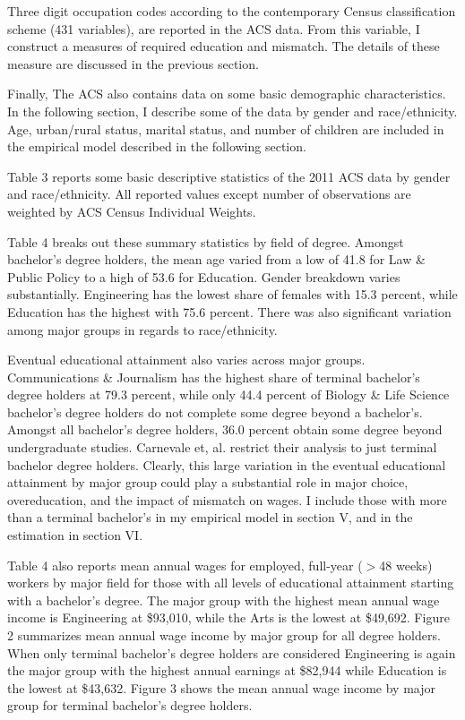 \documentclass[11pt]{article}
\theoremstyle{definition}
\begin{document}
\vspace{2mm}
Three digit occupation codes according to the contemporary Census classification scheme (431 variables), are reported in the ACS data.  From this variable, I construct a measures of required education and mismatch.  The details of these measure are discussed in the previous section.

\vspace{2mm}
Finally, The ACS also contains data on some basic demographic characteristics.  In the following section, I describe some of the data by gender and race/ethnicity.  Age, urban/rural status, marital status, and number of children are included in the empirical model described in the following section.

\vspace{2mm}
Table 3 reports some basic descriptive statistics of the 2011 ACS data by gender and race/ethnicity.  All reported values except number of observations are weighted by ACS Census Individual Weights.  

\vspace{2mm}
Table 4 breaks out these summary statistics by field of degree. Amongst bachelor's degree holders, the mean age varied from a low of 41.8 for Law \& Public Policy to a high of 53.6 for Education.  Gender breakdown varies substantially.  Engineering has the lowest share of females with 15.3 percent, while Education has the highest with 75.6 percent.  There was also significant variation among major groups in regards to race/ethnicity.  

\vspace{2mm}
Eventual educational attainment also varies across major groups.  Communications \& Journalism has the highest share of terminal bachelor's degree holders at 79.3 percent, while only 44.4 percent of Biology \& Life Science bachelor's degree holders do not complete some degree beyond a bachelor's.  Amongst all bachelor's degree holders, 36.0 percent obtain some degree beyond undergraduate studies.  Carnevale et, al. restrict their analysis to just terminal bachelor degree holders.  Clearly, this large variation in the eventual educational attainment by major group could play a substantial role in major choice, overeducation, and the impact of mismatch on wages.  I include those with more than a terminal bachelor's in my empirical model in section V, and in the estimation in section VI.  

\vspace{2mm}
Table 4 also reports mean annual wages for employed, full-year ($>$48 weeks) workers by major field for those with all levels of educational attainment starting with a bachelor's degree.  The major group with the highest mean annual wage income is Engineering at \$93,010, while the Arts is the lowest at \$49,692.  Figure 2 summarizes mean annual wage income by major group for all degree holders.  When only terminal bachelor's degree holders are considered Engineering is again the major group with the highest annual earnings at \$82,944 while Education is the lowest at \$43,632. Figure 3 shows the mean annual wage income by major group for terminal bachelor's degree holders.
\end{document}
